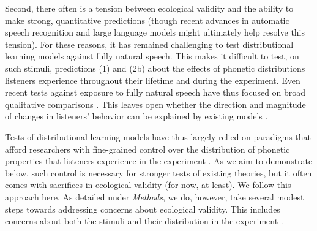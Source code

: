 \documentclass[
  11pt,
  man,mask,floatsintext]{apa6}
\begin{document}
Second, there often is a tension between ecological validity and the ability to make strong, quantitative predictions (though recent advances in automatic speech recognition and large language models might ultimately help resolve this tension). For these reasons, it has remained challenging to test distributional learning models against fully natural speech. This makes it difficult to test, on such stimuli, predictions (1) and (2b) about the effects of phonetic distributions listeners experience throughout their lifetime and during the experiment. Even recent tests against exposure to fully natural speech have thus focused on broad qualitative comparisons \autocites[e.g.,][]{schertz2016,xie2017}[see also,][]{schertz-clare2020}. This leaves open whether the direction and magnitude of changes in listeners' behavior can be explained by existing models \autocites[but see][]{hitczenko-feldman2016,tan2021,xie2021cognition}.

Tests of distributional learning models have thus largely relied on paradigms that afford researchers with fine-grained control over the distribution of phonetic properties that listeners experience in the experiment \autocites[e.g.,][]{chladkova2017,clayards2008,colby2018,idemaru-holt2011,kleinschmidt2020,theodore-monto2019}. As we aim to demonstrate below, such control is necessary for stronger tests of existing theories, but it often comes with sacrifices in ecological validity (for now, at least). We follow this approach here. As detailed under \emph{Methods}, we do, however, take several modest steps towards addressing concerns about ecological validity. This includes concerns about both the stimuli and their distribution in the experiment \autocite[see discussion in][]{baese-berk2018}.
\end{document}

